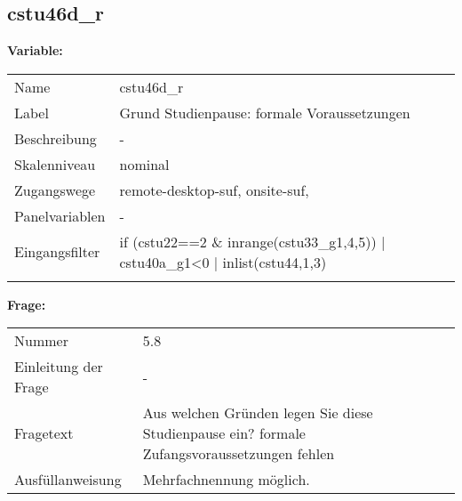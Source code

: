 	
	
	\subsection{cstu46d\_r}
	\label{subSection:cstu46d_r}

	\noindent\textbf{Variable:}\\
		\begin{tabular}{lL{11.3cm}}
			\label{tableVariable:cstu46d_r}
			Name & cstu46d\_r \\
			Label & Grund Studienpause: formale Voraussetzungen \\
			Beschreibung & - \\
			Skalenniveau & nominal \\
			Zugangswege &
				remote-desktop-suf,
				onsite-suf,
 \\
			Panelvariablen & -
			 \\
			Eingangsfilter & if (cstu22==2 \& inrange(cstu33\_g1,4,5)) | cstu40a\_g1\textless{}0 | inlist(cstu44,1,3) \\
 \\
		\end{tabular}

		\vspace*{1 cm}
		\noindent\textbf{Frage:}\\
		\begin{tabular}{lL{11.3cm}}
			\label{tableQuestion:cstu46d_r}
			Nummer & 5.8 \\
			Einleitung der Frage & - \\
			Fragetext & Aus welchen Gründen legen Sie diese Studienpause ein?
formale Zufangsvoraussetzungen fehlen \\
			Ausfüllanweisung & Mehrfachnennung möglich. \\
		\end{tabular}





